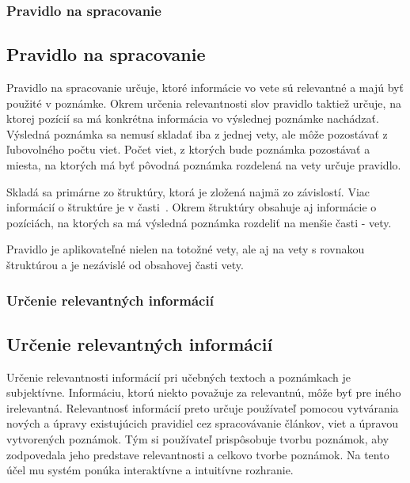 %
%
{
	\subsubsection{Pravidlo na spracovanie}
}
{
	\subsection{Pravidlo na spracovanie}
}
\label{subsubsection:rule_for_processing}
Pravidlo na spracovanie určuje, ktoré informácie vo vete sú relevantné a majú byť použité v poznámke. Okrem určenia relevantnosti slov pravidlo taktiež určuje, na ktorej pozícií sa má konkrétna informácia vo výslednej poznámke nachádzať. Výsledná poznámka sa nemusí skladať iba z jednej vety, ale môže pozostávať z ľubovolného počtu viet. Počet viet, z ktorých bude poznámka pozostávať a miesta, na ktorých má byť pôvodná poznámka rozdelená na vety určuje pravidlo.

Skladá sa primárne zo štruktúry, ktorá je zložená najmä zo závislostí. Viac informácií o štruktúre je v časti~. Okrem štruktúry obsahuje aj informácie o pozíciách, na ktorých sa má výsledná poznámka rozdeliť na menšie časti - vety.

Pravidlo je aplikovateľné nielen na totožné vety, ale aj na vety s rovnakou štruktúrou a je nezávislé od obsahovej časti vety.

%
%
{
	\subsubsection{Určenie relevantných informácií}
}
{
	\subsection{Určenie relevantných informácií}
}
\label{subsubsection:determination_of_relevant_information}
Určenie relevantnosti informácií pri učebných textoch a poznámkach je subjektívne. Informáciu, ktorú niekto považuje za relevantnú, môže byť pre iného irelevantná. Relevantnosť informácií preto určuje používateľ pomocou vytvárania nových a úpravy existujúcich pravidiel cez spracovávanie článkov, viet a úpravou vytvorených poznámok. Tým si používateľ prispôsobuje tvorbu poznámok, aby zodpovedala jeho predstave relevantnosti a celkovo tvorbe poznámok. Na tento účel mu systém ponúka interaktívne a intuitívne rozhranie.

